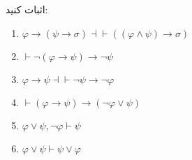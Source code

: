 اثبات کنید:
\begin{enumerate}[label=(\alph*)]
    \item $\varphi\to(\psi\to\sigma)\dashv\vdash((\varphi\wedge\psi)\to\sigma)$
    \item $\vdash\neg(\varphi\to\psi)\to\neg\psi$
    \item $\varphi\to\psi\dashv\vdash\neg\psi\to\neg\varphi$
    \item $\vdash(\varphi\to\psi)\to(\neg\varphi\vee\psi)$
    \item $\varphi\vee\psi,\neg\varphi\vdash\psi$
    \item $\varphi\vee\psi\vdash\psi\vee\varphi$
\end{enumerate}